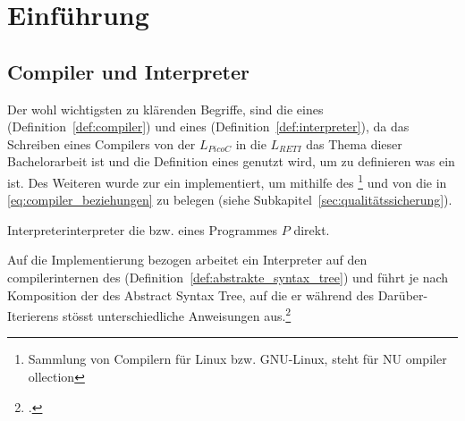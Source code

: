 
\chapter{Einführung}
\label{ch:einführung}

\section{Compiler und Interpreter}
Der wohl wichtigsten zu klärenden Begriffe, sind die eines  (Definition~\ref{def:compiler}) und eines   (Definition~\ref{def:interpreter}), da das Schreiben eines Compilers von der  $L_{PicoC}$ in die  $L_{RETI}$ das Thema dieser Bachelorarbeit ist und die Definition eines  genutzt wird, um zu definieren was ein  ist. Des Weiteren wurde zur  ein  implementiert, um mithilfe des \footnote{Sammlung von Compilern für Linux bzw. GNU-Linux, steht für NU ompiler ollection} und von  die  in \ref{eq:compiler_beziehungen} zu belegen (siehe Subkapitel~\ref{sec:qualitätssicherung}).

\begin{Definition}{Interpreter}{interpreter}
   die  bzw.  eines Programmes $P$ direkt.

  Auf die Implementierung bezogen arbeitet ein Interpreter auf den compilerinternen  des  (Definition~\ref{def:abstrakte_syntax_tree}) und führt je nach Komposition der  des Abstract Syntax Tree, auf die er während des Darüber-Iterierens stösst unterschiedliche Anweisungen aus.\footcite{thiemann_compilerbau_2021}
\end{Definition}

